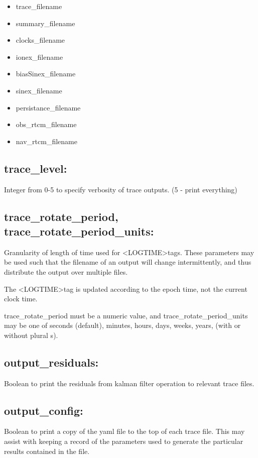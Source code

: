 \begin{itemize}
\item trace\_filename
\item summary\_filename
\item clocks\_filename
\item ionex\_filename
\item biasSinex\_filename
\item sinex\_filename
\item persistance\_filename
\item obs\_rtcm\_filename
\item nav\_rtcm\_filename
\end{itemize}

\subsection*{trace\_level:}
Integer from 0-5 to specify verbosity of trace outputs. (5 - print everything)

\subsection*{trace\_rotate\_period, trace\_rotate\_period\_units:}
Granularity of length of time used for \textless LOGTIME\textgreater tags. These parameters may be used such that the filename of an output will change intermittently, and thus distribute the output over multiple files.

The \textless LOGTIME\textgreater tag is updated according to the epoch time, not the current clock time.

trace\_rotate\_period must be a numeric value, and trace\_rotate\_period\_units may be one of seconds (default), minutes, hours, days, weeks, years, (with or without plural s).

\subsection*{output\_residuals:}
Boolean to print the residuals from kalman filter operation to relevant trace files.

\subsection*{output\_config:}
Boolean to print a copy of the yaml file to the top of each trace file. This may assist with keeping a record of the parameters used to generate the particular results contained in the file.

